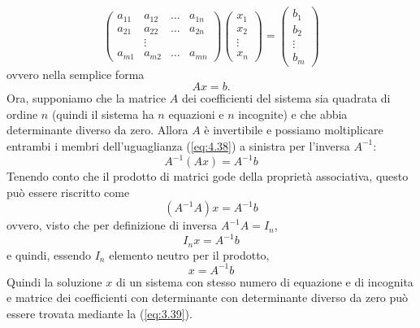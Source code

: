 \begin{equation*}
     \begin{pmatrix}
        a_{11} & a_{12} & \dots & a_{1n}\\
        a_{21} & a_{22} & \dots & a_{2n}\\
                &\vdots\\
        a_{m1} & a_{m2} & \dots & a_{mn}
    \end{pmatrix}
    \begin{pmatrix}
        x_1\\
        x_2\\
        \vdots\\
        x_n
    \end{pmatrix}= 
    \begin{pmatrix}
        b_1\\
        b_2\\
        \vdots\\
        b_m
    \end{pmatrix}
\end{equation*}
ovvero nella semplice forma
\begin{equation}
  \label{eq:4.38}
  Ax=b.
\end{equation}
Ora, supponiamo che la matrice $A$ dei coefficienti del sistema sia quadrata di ordine $n$ (quindi il sistema ha
$n$ equazioni e $n$ incognite) e che abbia determinante diverso da zero. Allora $A$ è invertibile e possiamo
moltiplicare entrambi i membri dell'uguaglianza (\ref{eq:4.38}) a sinistra per l'inversa $A^{-1}$:
\begin{equation*}
  A^{-1}(Ax)=A^{-1}b
\end{equation*}
Tenendo conto che il prodotto di matrici gode della proprietà associativa, questo può essere riscritto come
\begin{equation*}
  (A^{-1}A)x=A^{-1}b
\end{equation*}
ovvero, visto che per definizione di inversa $A^{-1}A=I_n$,
\begin{equation*}
   I_nx=A^{-1}b 
\end{equation*}
e quindi, essendo $I_n$ elemento neutro per il prodotto,
\begin{equation}
  \label{eq:3.39}
  x=A^{-1}b
\end{equation}
Quindi la soluzione $x$ di un sistema con stesso numero di equazione e di incognita e matrice dei coefficienti con
determinante con determinante diverso da zero può essere trovata mediante la (\ref{eq:3.39}).
